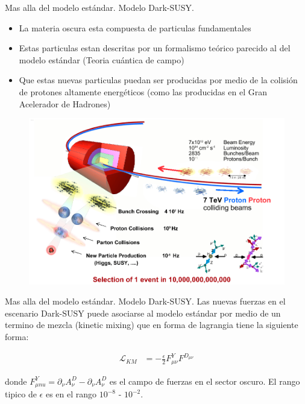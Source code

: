 \begin{frame}{Mas alla del modelo est\'andar. Modelo Dark-SUSY.}

\begin{itemize}
\item La materia oscura esta compuesta de particulas fundamentales 
\item Estas particulas estan descritas por un formalismo te\'orico parecido al del modelo est\'andar (Teoria cu\'antica de campo) 
\item Que estas nuevas particulas puedan ser producidas por medio de la colisi\'on de protones altamente energ\'eticos (como las producidas en el Gran Acelerador de Hadrones)
\end{itemize}

\begin{figure}
\centering
\includegraphics[width=.3\textwidth]{Imag/sketch_collisions.png}
\end{figure}
    
\end{frame}



\begin{frame}{Mas alla del modelo est\'andar. Modelo Dark-SUSY.}
Las nuevas fuerzas en el escenario Dark-SUSY puede asociarse al modelo est\'andar por medio de un termino de mezcla (kinetic mixing) que en forma de lagrangia tiene la siguiente forma: 

\begin{align*}
\mathcal{L}_{KM} &= - \frac{\epsilon}{2} F^{Y}_{\mu \nu} F^{D_{\mu \nu}} 
\end{align*} 

donde $F^{Y}_{\mu nu} = \partial_{\nu}A_{\nu}^{D} - \partial_{\nu}A_{\nu}^{D}$ es el campo de fuerzas en el sector oscuro. El rango tipico de $\epsilon$ es en el rango $10^{-8}$ - $10^{-2}$.
    
\end{frame}



